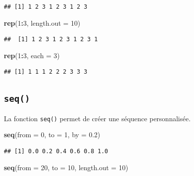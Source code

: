 \documentclass[
]{book}
\newenvironment{Shaded}{\begin{snugshade}}{\end{snugshade}}
\newcommand{\DataTypeTok}[1]{\textcolor[rgb]{0.13,0.29,0.53}{#1}}
\newcommand{\DecValTok}[1]{\textcolor[rgb]{0.00,0.00,0.81}{#1}}
\newcommand{\FloatTok}[1]{\textcolor[rgb]{0.00,0.00,0.81}{#1}}
\newcommand{\KeywordTok}[1]{\textcolor[rgb]{0.13,0.29,0.53}{\textbf{#1}}}
\newcommand{\NormalTok}[1]{#1}
\newcommand{\OperatorTok}[1]{\textcolor[rgb]{0.81,0.36,0.00}{\textbf{#1}}}
\begin{document}
\begin{verbatim}
## [1] 1 2 3 1 2 3 1 2 3
\end{verbatim}

\begin{Shaded}
\begin{Highlighting}[]
\KeywordTok{rep}\NormalTok{(}\DecValTok{1}\OperatorTok{:}\DecValTok{3}\NormalTok{, }\DataTypeTok{length.out =} \DecValTok{10}\NormalTok{)}
\end{Highlighting}
\end{Shaded}

\begin{verbatim}
##  [1] 1 2 3 1 2 3 1 2 3 1
\end{verbatim}

\begin{Shaded}
\begin{Highlighting}[]
\KeywordTok{rep}\NormalTok{(}\DecValTok{1}\OperatorTok{:}\DecValTok{3}\NormalTok{, }\DataTypeTok{each =} \DecValTok{3}\NormalTok{)}
\end{Highlighting}
\end{Shaded}

\begin{verbatim}
## [1] 1 1 1 2 2 2 3 3 3
\end{verbatim}

\hypertarget{l015seq}{%
\subsection{\texorpdfstring{\texttt{seq()}}{seq()}}\label{l015seq}}

La fonction \texttt{seq()} permet de créer une séquence personnalisée.

\begin{Shaded}
\begin{Highlighting}[]
\KeywordTok{seq}\NormalTok{(}\DataTypeTok{from =} \DecValTok{0}\NormalTok{, }\DataTypeTok{to =} \DecValTok{1}\NormalTok{, }\DataTypeTok{by =} \FloatTok{0.2}\NormalTok{)}
\end{Highlighting}
\end{Shaded}

\begin{verbatim}
## [1] 0.0 0.2 0.4 0.6 0.8 1.0
\end{verbatim}

\begin{Shaded}
\begin{Highlighting}[]
\KeywordTok{seq}\NormalTok{(}\DataTypeTok{from =} \DecValTok{20}\NormalTok{, }\DataTypeTok{to =} \DecValTok{10}\NormalTok{, }\DataTypeTok{length.out =} \DecValTok{10}\NormalTok{)}
\end{Highlighting}
\end{Shaded}
\end{document}
